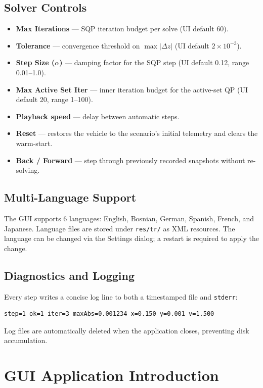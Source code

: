 ﻿\documentclass[11pt,a4paper]{article}
\begin{document}
\subsection{Solver Controls}
\begin{itemize}[leftmargin=1.2cm]
  \item \textbf{Max Iterations} --- SQP iteration budget per solve (UI default 60).
  \item \textbf{Tolerance} --- convergence threshold on $\max|\Delta z|$ (UI default $2\times10^{-3}$).
  \item \textbf{Step Size ($\alpha$)} --- damping factor for the SQP step (UI default 0.12, range 0.01--1.0).
  \item \textbf{Max Active Set Iter} --- inner iteration budget for the active-set QP (UI default 20, range 1--100).
  \item \textbf{Playback speed} --- delay between automatic steps.
  \item \textbf{Reset} --- restores the vehicle to the scenario's initial telemetry and clears the warm-start.
  \item \textbf{Back / Forward} --- step through previously recorded snapshots without re-solving.
\end{itemize}

\subsection{Multi-Language Support}
The GUI supports 6 languages: English, Bosnian, German, Spanish, French, and Japanese. Language files are stored under \texttt{res/tr/} as XML resources. The language can be changed via the Settings dialog; a restart is required to apply the change.

\subsection{Diagnostics and Logging}
Every step writes a concise log line to both a timestamped file and \texttt{stderr}:
\begin{lstlisting}
step=1 ok=1 iter=3 maxAbs=0.001234 x=0.150 y=0.001 v=1.500
\end{lstlisting}
Log files are automatically deleted when the application closes, preventing disk accumulation.
\section{GUI Application Introduction}
\end{document}
